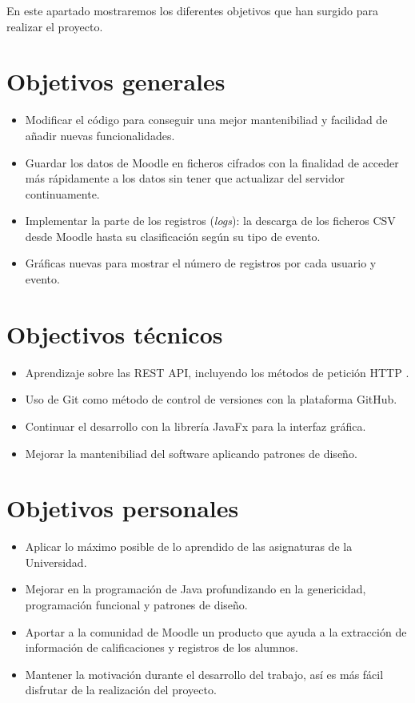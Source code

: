 
En este apartado mostraremos los diferentes objetivos que han surgido para realizar el proyecto.

\section{Objetivos generales}

\begin{itemize}
	\item Modificar el código para conseguir una mejor mantenibiliad y facilidad de añadir nuevas funcionalidades. 
	\item Guardar los datos de Moodle en ficheros cifrados con la finalidad de acceder más rápidamente a los datos sin tener que actualizar del servidor continuamente.
	\item Implementar la parte de los registros (\textit{logs}): la descarga de los ficheros CSV desde Moodle hasta su clasificación según su tipo de evento.
	\item Gráficas nuevas para mostrar el número de registros por cada usuario y evento.
\end{itemize}

\section{Objectivos técnicos}
\begin{itemize}
	\item Aprendizaje sobre las REST API, incluyendo los métodos de petición HTTP \cite{noauthor_http_nodate}.
	\item Uso de Git como método de control de versiones con la plataforma GitHub.
	\item Continuar el desarrollo con la librería JavaFx para la interfaz gráfica.
	\item Mejorar la mantenibiliad del software aplicando patrones de diseño.
\end{itemize}

\section{Objetivos personales}
\begin{itemize}
	\item Aplicar lo máximo posible de lo aprendido de las asignaturas de la Universidad.
	\item Mejorar en la programación de Java profundizando en la genericidad, programación funcional y patrones de diseño.
	\item Aportar a la comunidad de Moodle un producto que ayuda a la extracción de información de calificaciones y registros de los alumnos.
	\item Mantener la motivación durante el desarrollo del trabajo, así es más fácil disfrutar de la realización del proyecto.
\end{itemize}
